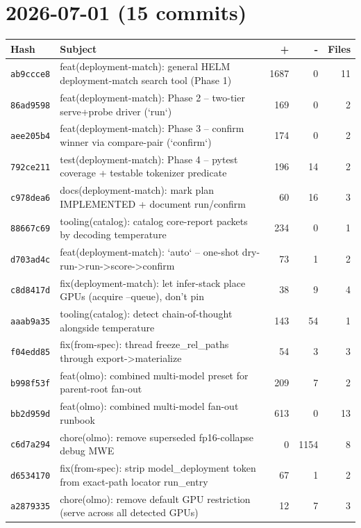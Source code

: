 \section*{2026-07-01 (15 commits)}
\begin{longtable}{@{}p{}p{}r r r@{}}
\toprule Hash & Subject & + & - & Files \\ \midrule\endhead
\texttt{ab9ccce8} & feat(deployment-match): general HELM deployment-match search tool (Phase 1) & 1687 & 0 & 11 \\
\texttt{86ad9598} & feat(deployment-match): Phase 2 -- two-tier serve+probe driver (`run`) & 169 & 0 & 2 \\
\texttt{aee205b4} & feat(deployment-match): Phase 3 -- confirm winner via compare-pair (`confirm`) & 174 & 0 & 2 \\
\texttt{792ce211} & test(deployment-match): Phase 4 -- pytest coverage + testable tokenizer predicate & 196 & 14 & 2 \\
\texttt{c978dea6} & docs(deployment-match): mark plan IMPLEMENTED + document run/confirm & 60 & 16 & 3 \\
\texttt{88667c69} & tooling(catalog): catalog core-report packets by decoding temperature & 234 & 0 & 1 \\
\texttt{d703ad4c} & feat(deployment-match): `auto` -- one-shot dry-run->run->score->confirm & 73 & 1 & 2 \\
\texttt{c8d8417d} & fix(deployment-match): let infer-stack place GPUs (acquire --queue), don't pin & 38 & 9 & 4 \\
\texttt{aaab9a35} & tooling(catalog): detect chain-of-thought alongside temperature & 143 & 54 & 1 \\
\texttt{f04edd85} & fix(from-spec): thread freeze\_rel\_paths through export->materialize & 54 & 3 & 3 \\
\texttt{b998f53f} & feat(olmo): combined multi-model preset for parent-root fan-out & 209 & 7 & 2 \\
\texttt{bb2d959d} & feat(olmo): combined multi-model fan-out runbook & 613 & 0 & 13 \\
\texttt{c6d7a294} & chore(olmo): remove superseded fp16-collapse debug MWE & 0 & 1154 & 8 \\
\texttt{d6534170} & fix(from-spec): strip model\_deployment token from exact-path locator run\_entry & 67 & 1 & 2 \\
\texttt{a2879335} & chore(olmo): remove default GPU restriction (serve across all detected GPUs) & 12 & 7 & 3 \\
\bottomrule\end{longtable}
